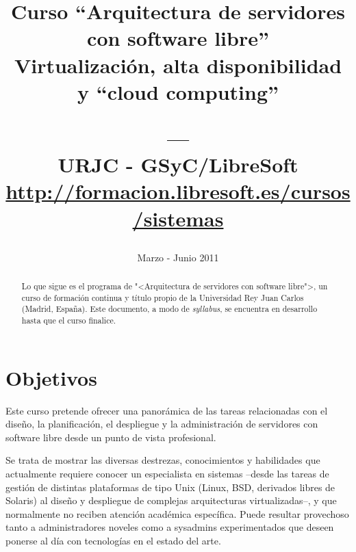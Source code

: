 \documentclass[a4paper]{article}
\title{\textbf{Curso ``Arquitectura de servidores \\ con software libre''} \\
Virtualización, alta disponibilidad \\ y ``cloud computing'' \\
\date{Marzo - Junio 2011}
\vspace{0.5cm}
--- \\
\normalsize{URJC - GSyC/LibreSoft} \\
\small{\url{http://formacion.libresoft.es/cursos/sistemas}}}
\begin{document}
  \maketitle

  \begin{abstract}
    Lo que sigue es el programa de "<Arquitectura de servidores con software libre">, un curso de formación continua y título propio de la Universidad Rey Juan Carlos (Madrid, España). 
    \medskip
    Este documento, a modo de \textit{syllabus}, se encuentra en desarrollo hasta que el curso finalice.
  \end{abstract}
  \newpage

  \tableofcontents

  \newpage

  \section{Objetivos}
  Este curso pretende ofrecer una panorámica de las tareas relacionadas con el diseño, la planificación, el despliegue y la administración de servidores con software libre desde un punto de vista profesional.

Se trata de mostrar las diversas destrezas, conocimientos y habilidades que actualmente requiere conocer un especialista en sistemas –desde las tareas de gestión de distintas plataformas de tipo Unix (Linux, BSD, derivados libres de Solaris) al diseño y despliegue de complejas arquitecturas virtualizadas–, y que normalmente no reciben atención académica específica. Puede resultar provechoso tanto a administradores noveles como a sysadmins experimentados que deseen ponerse al día con tecnologías en el estado del arte.
\end{document}
